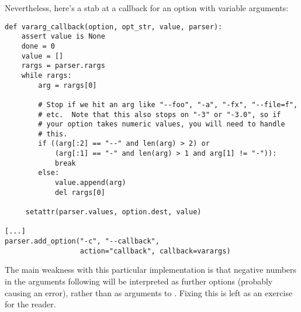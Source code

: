Nevertheless, here's a stab at a callback for an option with variable
arguments:
\begin{verbatim}
def vararg_callback(option, opt_str, value, parser):
    assert value is None
    done = 0
    value = []
    rargs = parser.rargs
    while rargs:
        arg = rargs[0]

        # Stop if we hit an arg like "--foo", "-a", "-fx", "--file=f",
        # etc.  Note that this also stops on "-3" or "-3.0", so if
        # your option takes numeric values, you will need to handle
        # this.
        if ((arg[:2] == "--" and len(arg) > 2) or
            (arg[:1] == "-" and len(arg) > 1 and arg[1] != "-")):
            break
        else:
            value.append(arg)
            del rargs[0]

     setattr(parser.values, option.dest, value)

[...]
parser.add_option("-c", "--callback",
                  action="callback", callback=varargs)
\end{verbatim}

The main weakness with this particular implementation is that negative
numbers in the arguments following  will be interpreted as
further options (probably causing an error), rather than as arguments to
.  Fixing this is left as an exercise for the reader.

